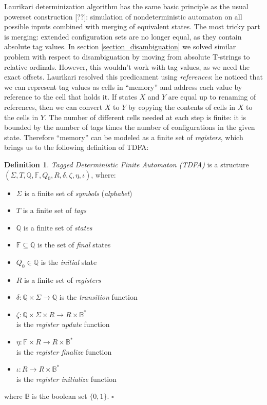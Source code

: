 \documentclass{article}
\newcommand{\YB}{\mathbb{B}}
\newcommand{\YF}{\mathbb{F}}
\newcommand{\YQ}{\mathbb{Q}}
\theoremstyle{definition}
\newtheorem{Xdef}{Definition}
\begin{document}
\begin{multicols}{2}
Laurikari determinization algorithm has the same basic principle as the usual powerset construction [??]:
simulation of nondeterministic automaton on all possible inputs combined with merging of equivalent states.
The most tricky part is merging: extended configuration sets are no longer equal, as they contain absolute tag values.
In section \ref{section_disambiguation} we solved similar problem with respect to disambiguation
by moving from absolute T-strings to relative ordinals.
However, this wouldn't work with tag values, as we need the exact offsets.
Laurikari resolved this predicament using \emph{references}:
he noticed that we can represent tag values as cells in ``memory'' and address each value by reference to the cell that holds it.
If states $X$ and $Y$ are equal up to renaming of references,
then we can convert $X$ to $Y$ by copying the contents of cells in $X$ to the cells in $Y$.
The number of different cells needed at each step is finite:
it is bounded by the number of tags times the number of configurations in the given state.
Therefore ``memory'' can be modeled as a finite set of \emph{registers},
which brings us to the following definition of TDFA:

    \begin{Xdef}
    \emph{Tagged Deterministic Finite Automaton (TDFA)}
    is a structure $(\Sigma, T, \YQ, \YF, Q_0, R, \delta, \zeta, \eta, \iota)$, where:
    \begin{itemize}
    \setlength{\parskip}{0.5em}
        \item[] $\Sigma$ is a finite set of \emph{symbols} (\emph{alphabet})
        \item[] $T$ is a finite set of \emph{tags}
        \item[] $\YQ$ is a finite set of \emph{states}
        \item[] $\YF \subseteq \YQ$ is the set of \emph{final} states
        \item[] $Q_0 \in \YQ$ is the \emph{initial} state
        \item[] $R$ is a finite set of \emph{registers}
        \item[] $\delta: \YQ \times \Sigma \to \YQ$ is the \emph{transition} function
        \item[] $\zeta: \YQ \times \Sigma \times R \to R \times \YB^*$ \\
            is the \emph{register update} function
        \item[] $\eta: \YF \times R \to R \times \YB^*$ \\
            is the \emph{register finalize} function
        \item[] $\iota: R \to R \times \YB^*$ \\
            is the \emph{register initialize} function
    \end{itemize}
    where $\YB$ is the boolean set $\{0,1\}$.
    $\square$
    \end{Xdef}


\end{multicols}
\end{document}
